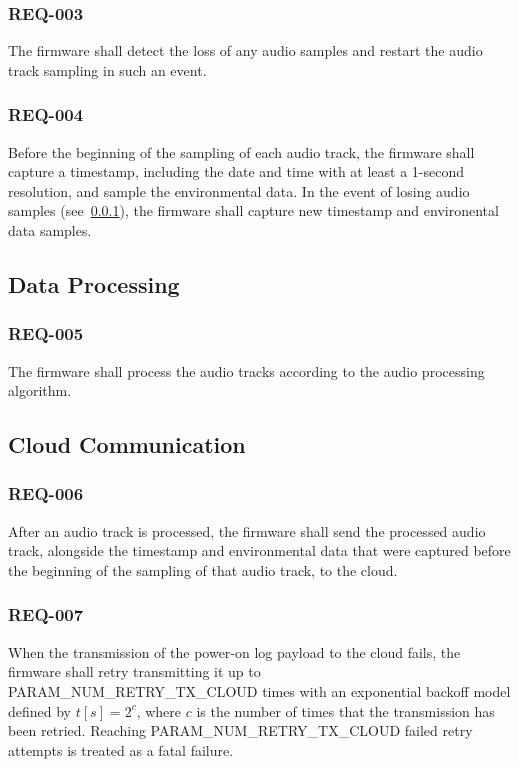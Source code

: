 \documentclass[11pt,a4paper]{article}
\begin{document}
\subsubsection{REQ-003}\label{sec:req003}

The firmware shall detect the loss of any audio samples and restart the audio
track sampling in such an event.

\subsubsection{REQ-004}

Before the beginning of the sampling of each audio track, the firmware shall
capture a timestamp, including the date and time with at least a 1-second
resolution, and sample the environmental data. In the event of losing audio
samples (see~\ref{sec:req003}), the firmware shall capture new timestamp and
environental data samples.

\subsection{Data Processing}

\subsubsection{REQ-005}

The firmware shall process the audio tracks according to the audio processing
algorithm.

\subsection{Cloud Communication}

\subsubsection{REQ-006}

After an audio track is processed, the firmware shall send the processed audio
track, alongside the timestamp and environmental data that were captured before
the beginning of the sampling of that audio track, to the cloud.

\subsubsection{REQ-007}

When the transmission of the power-on log payload to the cloud fails, the
firmware shall retry transmitting it up to PARAM\_NUM\_RETRY\_TX\_CLOUD times
with an exponential backoff model defined by $t[s]=2^c$, where $c$ is the number
of times that the transmission has been retried. Reaching
PARAM\_NUM\_RETRY\_TX\_CLOUD failed retry attempts is treated as a fatal
failure.
\end{document}
